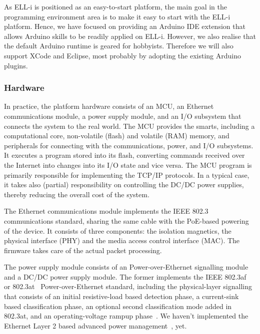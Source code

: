\documentclass[draft,a4paper]{siamltex}
\begin{document}
As ELL-i is positioned as an easy-to-start platform, the main goal in
the programming environment area is to make it easy to start with the
ELL-i platform.  Hence, we have focused on providing an Arduino IDE
extension that allows Arduino skills to be readily applied on ELL-i.
However, we also realise that the default Arduino runtime is geared
for hobbyists.  Therefore we will also support XCode and Eclipse, most
probably by adopting the existing Arduino plugins.

\subsubsection{Hardware}

In practice, the platform hardware consists of an MCU, an Ethernet
communications module, a power supply module, and an I/O subsystem
that connects the system to the real world.  The MCU provides the
smarts, including a computational core, non-volatile (flash) and
volatile (RAM) memory, and peripherals for connecting with the
communications, power, and I/O subsystems.  It executes a program
stored into its flash, converting commands received over the Internet
into changes into its I/O state and vice versa.  The MCU program is
primarily responsible for implementing the TCP/IP protocols.  In a
typical case, it takes also (partial) responsibility on controlling
the DC/DC power supplies, thereby reducing the overall cost of the
system.

The Ethernet communications module implements the IEEE 802.3~\cite{802.3}
communications standard, sharing the same cable with the PoE-based
powering of the device.  It consists of three components: the
isolation magnetics, the physical interface (PHY) and the media access
control interface (MAC).  The firmware takes care of the actual packet
processing.

The power supply module consists of an Power-over-Ethernet signalling
module and a DC/DC power supply module.  The former implements the
IEEE 802.3af~\cite{802.3af} or 802.3at~\cite{802.3at}
Power-over-Ethernet standard, including the physical-layer signalling
that consists of an initial resistive-load based detection phase, a
current-sink based classification phase, an optional second
classification mode added in 802.3at, and an operating-voltage rampup
phase~\cite{802.3at}.  We haven't implemented the Ethernet Layer 2
based advanced power management~\cite{802.3at}, yet.
\end{document}
